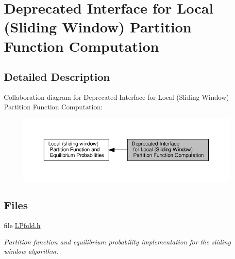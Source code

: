 \hypertarget{group__part__func__window__deprecated}{}\section{Deprecated Interface for Local (Sliding Window) Partition Function Computation}
\label{group__part__func__window__deprecated}


\subsection{Detailed Description}
Collaboration diagram for Deprecated Interface for Local (Sliding Window) Partition Function Computation\+:
\nopagebreak
\begin{figure}[H]
\begin{center}
\leavevmode
\includegraphics[width=350pt]{group__part__func__window__deprecated}
\end{center}
\end{figure}
\subsection*{Files}
\begin{DoxyCompactItemize}
\item 
file \hyperlink{LPfold_8h}{L\+Pfold.\+h}
\begin{DoxyCompactList}\small\item\em Partition function and equilibrium probability implementation for the sliding window algorithm. \end{DoxyCompactList}\end{DoxyCompactItemize}
